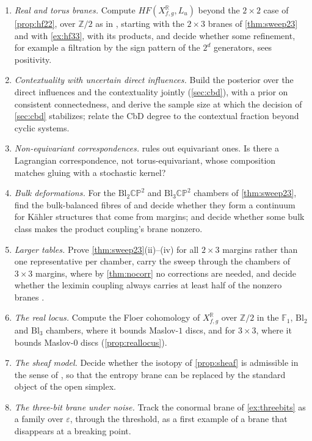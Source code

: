 \documentclass[11pt]{article}
\theoremstyle{definition}
\theoremstyle{remark}
\newcommand{\R}{\mathbb{R}}
\newcommand{\Z}{\mathbb{Z}}
\begin{document}
\begin{enumerate}[leftmargin=*]
\item \emph{Real and torus branes.} Compute $HF(X^{\R}_{f,g},L_u)$ beyond the $2\times2$ case of \cref{prop:hf22}, over $\Z/2$ as in
  \cite{AlstonAmorim2012}, starting with the $2\times3$ branes of \cref{thm:sweep23} and with \cref{ex:hf33},
  with its products, and decide whether some refinement, for example a filtration by the sign pattern of the $2^d$ generators, sees
  positivity.
\item \emph{Contextuality with uncertain direct influences.} Build the posterior over the direct influences and the contextuality
  jointly (\cref{sec:cbd}), with a prior on consistent connectedness, and derive the sample size at which the decision of \cref{sec:cbd}
  stabilizes; relate the CbD degree to the contextual fraction beyond cyclic systems.
\item \emph{Non-equivariant correspondences.}  rules out equivariant ones. Is there a Lagrangian correspondence, not
  torus-equivariant, whose composition matches gluing with a stochastic kernel?
\item \emph{Bulk deformations.} For the $\mathrm{Bl}_2\mathbb{CP}^2$ and $\mathrm{Bl}_3\mathbb{CP}^2$ chambers of \cref{thm:sweep23}, find the
  bulk-balanced fibres of \cite{FOOO2011} and decide whether they form a continuum for Kähler structures that come from margins; and decide whether
  some bulk class makes the product coupling's brane nonzero.
\item \emph{Larger tables.} Prove \cref{thm:sweep23}(ii)--(iv) for all $2\times3$ margins rather than one representative per chamber, carry the sweep
  through the chambers of $3\times3$ margins, where by \cref{thm:nocorr} no corrections are needed, and decide whether the leximin coupling always
  carries at least half of the nonzero branes \cite[Obs.~10.10]{Conditionals}.
\item \emph{The real locus.} Compute the Floer cohomology of $X^{\R}_{f,g}$ over $\Z/2$ in the $\mathbb F_1$, $\mathrm{Bl}_2$ and $\mathrm{Bl}_3$ chambers,
  where it bounds Maslov-$1$ discs, and for $3\times3$, where it bounds Maslov-$0$ discs (\cref{prop:reallocus}).
\item \emph{The sheaf model.} Decide whether the isotopy of \cref{prop:sheaf} is admissible in the sense of \cite{NadlerZaslow2009}, so that the
  entropy brane can be replaced by the standard object of the open simplex.
\item \emph{The three-bit brane under noise.} Track the conormal brane of \cref{ex:threebits} as a family over $\varepsilon$, through the
  threshold, as a first example of a brane that disappears at a breaking point.
\end{enumerate}
\end{document}
